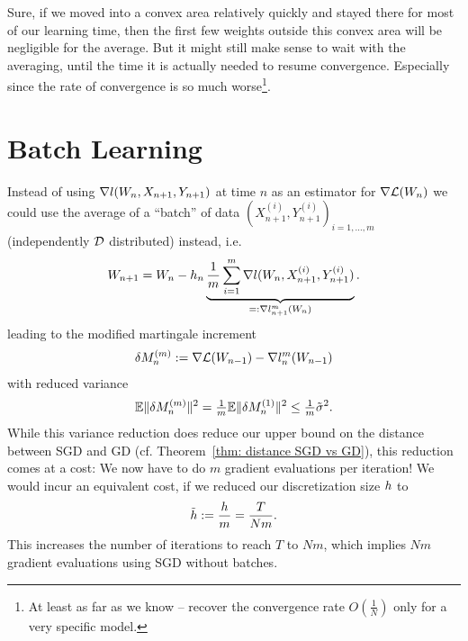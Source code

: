 Sure, if we moved into a convex area relatively quickly and stayed there for
most of our learning time, then the first few weights outside this convex
area will be negligible for the average.
But it might still make sense to wait with the averaging, until the time it is
actually needed to resume convergence. Especially since the rate of convergence
is so much worse\footnote{
	At least as far as we know -- \textcite{bachNonstronglyconvexSmoothStochastic2013}
	recover the convergence rate \(O(\tfrac1N)\) only for a very specific model.
}.

\section{Batch Learning}\label{sec: batch learning}

Instead of using \(\nabla l(W_n, X_{n+1}, Y_{n+1})\) at time \(n\) as an
estimator for \(\nabla\mathcal{L}(W_n)\) we could use the average of a
``batch'' of data \((X^{(i)}_{n+1}, Y^{(i)}_{n+1})_{i=1,\dots,m}\) (independently
\(\mathcal{D}\) distributed) instead, i.e.
\begin{align*}
	W_{n+1} = W_n
	-h_n \underbrace{\frac1{m}\sum_{i=1}^m\nabla l(W_n,X^{(i)}_{n+1}, Y^{(i)}_{n+1})}_{
		=:\nabla l_{n+1}^m(W_n)
	}.
\end{align*}
leading to the modified martingale increment
\begin{align*}
	\delta M_n^{(m)}
	:= \nabla\mathcal{L}(W_{n-1})
	- \nabla l_n^m(W_{n-1})
\end{align*}
with reduced variance
\begin{align*}
	\mathbb{E}\|\delta M_n^{(m)}\|^2 = \tfrac1m\mathbb{E}\|\delta M_n^{(1)}\|^2 \le \tfrac1m \tilde{\sigma}^2.
\end{align*}
While this variance reduction does reduce our upper bound on the distance
between SGD and GD (cf. Theorem~\ref{thm: distance SGD vs GD}), this reduction
comes at a cost: We now have to do \(m\) gradient evaluations per iteration!
We would incur an equivalent cost, if we reduced our discretization size \(h\)
to
 \begin{align*}
	\tilde{h}:=\frac{h}{m}=\frac{T}{Nm}.
\end{align*}
This increases the number of iterations to reach \(T\) to \(Nm\), which implies
\(Nm\) gradient evaluations using SGD without batches.

